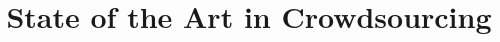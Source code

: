 \documentclass{sig-alternate}
\begin{document}
%

\title{State of the Art in Crowdsourcing
}
%
%
%
%
%
\end{document}
